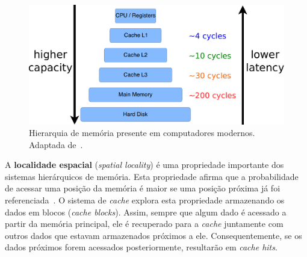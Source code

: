 \begin{figure}[ht]
    \centering
    \includegraphics[width=0.7\linewidth]{img/tecnica/memoryHierarchy}
    \caption[Hierarquia de memória]{Hierarquia de memória presente em computadores modernos. Adaptada de~.}
    \label{fig:memoryHierarchy}
\end{figure}

A \textbf{localidade espacial} (\textit{spatial locality}) é uma propriedade importante dos sistemas hierárquicos de memória. Esta propriedade afirma que a probabilidade de acessar uma posição da memória é maior se uma posição próxima já foi referenciada~\cite{patterson2013computer}. O sistema de \textit{cache} explora esta propriedade armazenando os dados em blocos (\textit{cache blocks}). Assim, sempre que algum dado é acessado a partir da memória principal, ele é recuperado para a \textit{cache} juntamente com outros dados que estavam armazenados próximos a ele. Consequentemente, se os dados próximos forem acessados posteriormente, resultarão em \textit{cache hits}.








